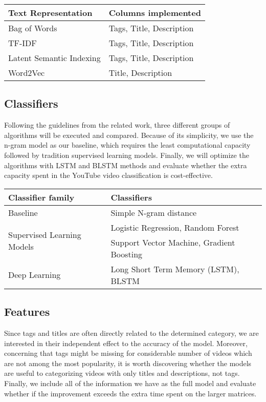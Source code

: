 \documentclass[letterpaper, 12pt]{article}
\begin{document}
\begin{table}[H]
  \centering
  \begin{tabular}{ll}
    \toprule
    Text Representation & Columns implemented \\
    \midrule
    Bag of Words & Tags, Title, Description \\
    TF-IDF & Tags, Title, Description \\
    Latent Semantic Indexing & Tags, Title, Description \\
    Word2Vec &  Title, Description \\
    \bottomrule
  \end{tabular}
\end{table}

\subsection{Classifiers}

Following the guidelines from the related work, three different groups of algorithms will be executed and compared. Because of its simplicity, we use the n-gram model as our baseline, which requires the least computational capacity followed by tradition supervised learning models. Finally, we will optimize the algorithms with LSTM and BLSTM methods and evaluate whether the extra capacity spent in the YouTube video classification is cost-effective.

\begin{table}[H]
  \centering
  \begin{tabular}{ll}
    \toprule
    Classifier family & Classifiers \\
    \midrule
    Baseline & Simple N-gram distance \\ [0.5em]
    \multirow{2}{*}{Supervised Learning Models} & Logistic Regression, Random Forest \\
    & Support Vector Machine, Gradient Boosting \\ [0.5em]
    Deep Learning & Long Short Term Memory (LSTM), BLSTM \\
    \bottomrule
  \end{tabular}
\end{table}

\subsection{Features}

Since tags and titles are often directly related to the determined category, we are interested in their independent effect to the accuracy of the model. Moreover, concerning that tags might be missing for considerable number of videos which are not among the most popularity, it is worth discovering whether the models are useful to categorizing videos with only titles and descriptions, not tags. Finally, we include all of the information we have as the full model and evaluate whether if the improvement exceeds the extra time spent on the larger matrices.
\end{document}
